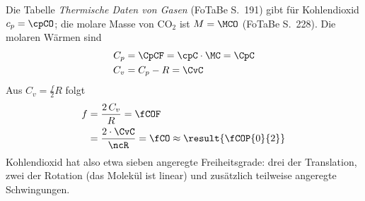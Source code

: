 Die Tabelle \emph{Thermische Daten von Gasen} (FoTaBe S.~191) gibt für Kohlendioxid $c_p = \cpCO$; die molare Masse von CO$_2$ ist $M = \MCO$ (FoTaBe S.~228). Die molaren Wärmen sind
\begin{align}
 C_p &= \CpCF = \cpC\cdot\MC = \CpC \\
 C_v &= C_p - R = \CvC
\end{align}
Aus $C_v = \frac{f}{2}R$ folgt
\begin{align}
 f &= \frac{2\,C_v}{R} = \fCOF \\
   &= \frac{2\cdot\CvC}{\ncR} = \fCO \approx \result{\fCOP{0}{2}}
\end{align}
Kohlendioxid hat also etwa sieben angeregte Freiheitsgrade: drei der Translation, zwei der Rotation (das Molekül ist linear) und zusätzlich teilweise angeregte Schwingungen.
